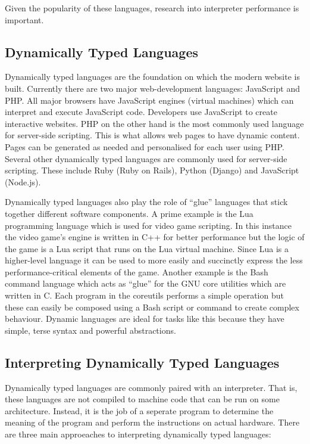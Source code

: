\documentclass[english,a4paper]{article}
\begin{document}
Given the popularity of these languages, research into interpreter
performance is important.

\subsection{Dynamically Typed Languages}
Dynamically typed languages are the foundation on which the modern
website is built. Currently there are two major web-development
languages: JavaScript and PHP. All major browsers have JavaScript
engines (virtual machines) which can interpret and execute JavaScript
code. Developers use JavaScript to create interactive websites. PHP on
the other hand is the most commonly used language for server-side
scripting. This is what allows web pages to have dynamic
content. Pages can be generated as needed and personalised for each
user using PHP. Several other dynamically typed languages are commonly
used for server-side scripting. These include Ruby (Ruby on Rails),
Python (Django) and JavaScript (Node.js).

Dynamically typed languages also play the role of ``glue'' languages
that stick together different software components. A prime example is
the Lua programming language which is used for video game
scripting. In this instance the video game's engine is written in C++
for better performance but the logic of the game is a Lua script that
runs on the Lua virtual machine. Since Lua is a higher-level language
it can be used to more easily and succinctly express the less
performance-critical elements of the game. Another example is the Bash
command language which acts as ``glue'' for the GNU core utilities
which are written in C. Each program in the coreutils performs a
simple operation but these can easily be composed using a Bash script
or command to create complex behaviour. Dynamic languages are ideal
for tasks like this because they have simple, terse syntax and
powerful abstractions.

\subsection{Interpreting Dynamically Typed Languages}
Dynamically typed languages are commonly paired with an
interpreter. That is, these languages are not compiled to machine code
that can be run on some architecture. Instead, it is the job of a
seperate program to determine the meaning of the program and perform
the instructions on actual hardware. There are three main approeaches
to interpreting dynamically typed languages:
\end{document}
